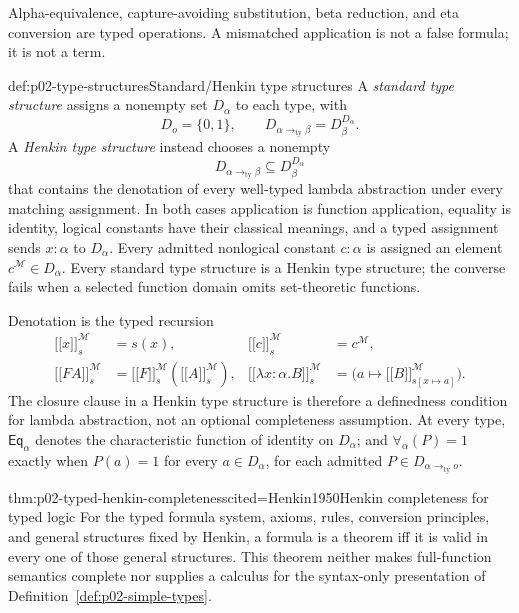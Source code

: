 Alpha-equivalence, capture-avoiding substitution, beta reduction, and eta
conversion are typed operations.  A mismatched application is not a false
formula; it is not a term.

\begin{hbdefinition}{def:p02-type-structures}{Standard/Henkin type structures}
A \emph{standard type structure} assigns a nonempty set \(D_\alpha\) to each
type, with
\[
 D_o=\{0,1\},
 \qquad
 D_{\alpha\mathbin{\to_{\mathrm{ty}}}\beta}
   =D_\beta^{D_\alpha}.
\]
A \emph{Henkin type structure} instead chooses a nonempty
\[
 D_{\alpha\mathbin{\to_{\mathrm{ty}}}\beta}
 \subseteq D_\beta^{D_\alpha}
\]
that contains the denotation of every well-typed lambda abstraction under
every matching assignment.  In both cases application is function
application, equality is identity, logical constants have their classical
meanings, and a typed assignment sends \(x:\alpha\) to \(D_\alpha\).
Every admitted nonlogical constant \(c:\alpha\) is assigned an element
\(c^{\mathcal M}\in D_\alpha\).
Every standard type structure is a Henkin type structure; the converse fails
when a selected function domain omits set-theoretic functions.
\end{hbdefinition}

Denotation is the typed recursion
\[
\begin{aligned}
 \lbrack\!\lbrack x\rbrack\!\rbrack_s^{\mathcal M}&=s(x),
&\lbrack\!\lbrack c\rbrack\!\rbrack_s^{\mathcal M}&=c^{\mathcal M},\\
 \lbrack\!\lbrack FA\rbrack\!\rbrack_s^{\mathcal M}
 &=\lbrack\!\lbrack F\rbrack\!\rbrack_s^{\mathcal M}
   (\lbrack\!\lbrack A\rbrack\!\rbrack_s^{\mathcal M}),
&\lbrack\!\lbrack\lambda x{:}\alpha.B\rbrack\!\rbrack_s^{\mathcal M}
 &=\bigl(a\mapsto\lbrack\!\lbrack B\rbrack\!\rbrack_{s[x\mapsto a]}^{\mathcal M}\bigr).
\end{aligned}
\]
The closure clause in a Henkin type structure is therefore a definedness
condition for lambda abstraction, not an optional completeness assumption.
At every type, \(\mathsf{Eq}_{\alpha}\) denotes the characteristic function of identity
on \(D_\alpha\); and \(\forall_\alpha(P)=1\) exactly when
\(P(a)=1\) for every \(a\in D_\alpha\), for each admitted
\(P\in D_{\alpha\mathbin{\to_{\mathrm{ty}}}o}\).

\begin{hbtheorem}{thm:p02-typed-henkin-completeness}{cited=Henkin1950}{Henkin completeness for typed logic}
For the typed formula system, axioms, rules, conversion principles, and general
structures fixed by Henkin, a formula is a theorem iff it is valid in every
one of those general structures.  This theorem neither makes full-function
semantics complete nor supplies a calculus for the syntax-only presentation
of Definition~\ref{def:p02-simple-types}.
\end{hbtheorem}

